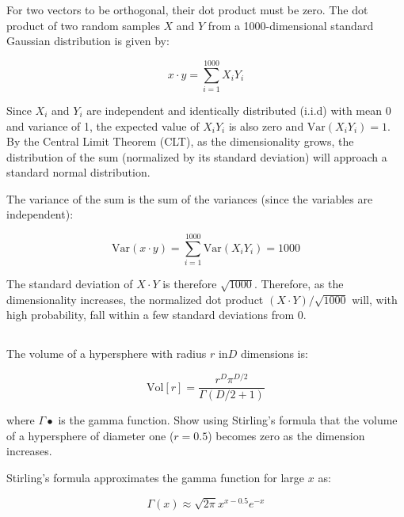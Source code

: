 \documentclass[12pt]{report}
\begin{document}
For two vectors to be orthogonal, their dot product must be zero. The dot product of two random samples $X$ and $Y$ from a 1000-dimensional standard Gaussian distribution is given by:

\begin{equation*}
    x \cdot y = \sum_{i=1}^{1000} X_{i}Y_{i}
\end{equation*}

Since $X_{i}$ and $Y_{i}$ are independent and identically distributed (i.i.d) with mean 0 and variance of 1, the expected value of $X_{i}Y_{i}$ is also zero and $\text{Var}(X_{i}Y_{i}) = 1$. By the Central Limit Theorem (CLT), as the dimensionality grows, the distribution of the sum (normalized by its standard deviation) will approach a standard normal distribution.

The variance of the sum is the sum of the variances (since the variables are independent):

\begin{equation*}
    \text{Var}(x \cdot y) = \sum_{i=1}^{1000} \text{Var}(X_{i}Y_{i}) = 1000
\end{equation*}

The standard deviation of $X\cdot Y$ is therefore $\sqrt{1000}$. Therefore, as the dimensionality increases, the normalized dot product $(X\cdot Y) / \sqrt{1000}$  will, with high probability, fall within a few standard deviations from 0.

\subsection{}
\begin{mdframed}
    The volume of a hypersphere with radius $r$ in$D$ dimensions is:

    \begin{equation*}
        \text{Vol}[r] = \frac{r^{D}\pi^{D/2}}{\Gamma(D/2 + 1)}
    \end{equation*}

    where $\Gamma{\bullet}$ is the gamma function. Show using Stirling's formula that the volume of a hypersphere of diameter one ($r=0.5$) becomes zero as the dimension increases.
\end{mdframed}

Stirling's formula approximates the gamma function for large $x$ as:

\begin{equation*}
    \Gamma(x) \approx \sqrt{2\pi}x^{x-0.5}e^{-x}
\end{equation*}
\end{document}
